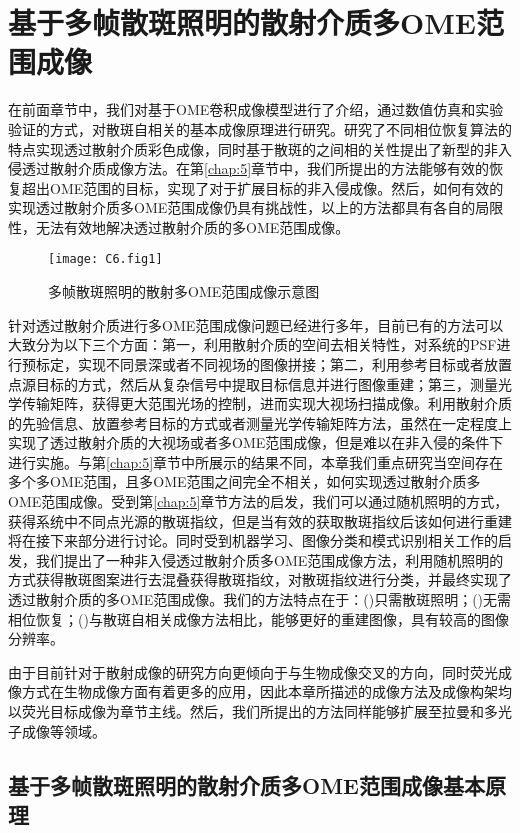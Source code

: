 
\chapter{基于多帧散斑照明的散射介质多OME范围成像}

在前面章节中，我们对基于OME卷积成像模型进行了介绍，通过数值仿真和实验验证的方式，对散斑自相关的基本成像原理进行研究。研究了不同相位恢复算法的特点实现透过散射介质彩色成像，同时基于散斑的之间相的关性提出了新型的非入侵透过散射介质成像方法。在第\ref{chap:5}章节中，我们所提出的方法能够有效的恢复超出OME范围的目标，实现了对于扩展目标的非入侵成像。然后，如何有效的实现透过散射介质多OME范围成像仍具有挑战性，以上的方法都具有各自的局限性，无法有效地解决透过散射介质的多OME范围成像。

\begin{figure}[htp]
	\centering
	\texttt{[image: C6.fig1]}
	\caption{多帧散斑照明的散射多OME范围成像示意图}
	\label{fig:6.1}
\end{figure}

针对透过散射介质进行多OME范围成像问题已经进行多年，目前已有的方法可以大致分为以下三个方面：第一，利用散射介质的空间去相关特性，对系统的PSF进行预标定，实现不同景深或者不同视场的图像拼接；第二，利用参考目标或者放置点源目标的方式，然后从复杂信号中提取目标信息并进行图像重建；第三，测量光学传输矩阵，获得更大范围光场的控制，进而实现大视场扫描成像。利用散射介质的先验信息、放置参考目标的方式或者测量光学传输矩阵方法，虽然在一定程度上实现了透过散射介质的大视场或者多OME范围成像，但是难以在非入侵的条件下进行实施。与第\ref{chap:5}章节中所展示的结果不同，本章我们重点研究当空间存在多个多OME范围，且多OME范围之间完全不相关，如何实现透过散射介质多OME范围成像。受到第\ref{chap:5}章节方法的启发，我们可以通过随机照明的方式，获得系统中不同点光源的散斑指纹，但是当有效的获取散斑指纹后该如何进行重建将在接下来部分进行讨论。同时受到机器学习、图像分类和模式识别相关工作的启发，我们提出了一种非入侵透过散射介质多OME范围成像方法，利用随机照明的方式获得散斑图案进行去混叠获得散斑指纹，对散斑指纹进行分类，并最终实现了透过散射介质的多OME范围成像。我们的方法特点在于：()只需散斑照明；()无需相位恢复；()与散斑自相关成像方法相比，能够更好的重建图像，具有较高的图像分辨率。

由于目前针对于散射成像的研究方向更倾向于与生物成像交叉的方向，同时荧光成像方式在生物成像方面有着更多的应用，因此本章所描述的成像方法及成像构架均以荧光目标成像为章节主线。然后，我们所提出的方法同样能够扩展至拉曼和多光子成像等领域。

\section{基于多帧散斑照明的散射介质多OME范围成像基本原理}

